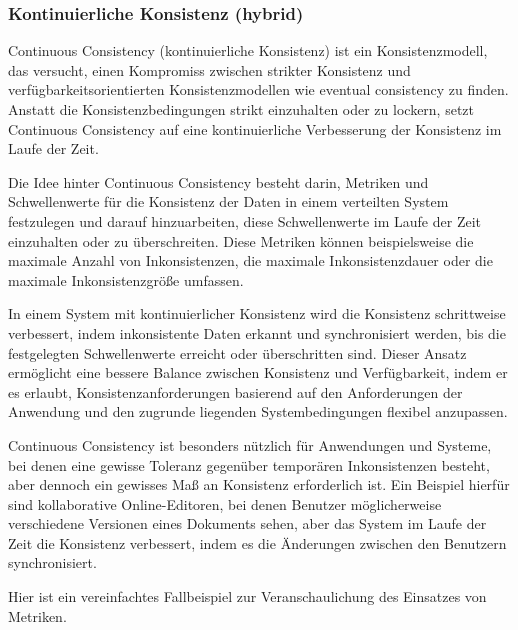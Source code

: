 \subsubsection{Kontinuierliche Konsistenz (hybrid)}
Continuous Consistency (kontinuierliche Konsistenz) ist ein Konsistenzmodell, das versucht, einen Kompromiss zwischen strikter Konsistenz und verfügbarkeitsorientierten Konsistenzmodellen wie eventual consistency zu finden. Anstatt die Konsistenzbedingungen strikt einzuhalten oder zu lockern, setzt Continuous Consistency auf eine kontinuierliche Verbesserung der Konsistenz im Laufe der Zeit.

Die Idee hinter Continuous Consistency besteht darin, Metriken und Schwellenwerte für die Konsistenz der Daten in einem verteilten System festzulegen und darauf hinzuarbeiten, diese Schwellenwerte im Laufe der Zeit einzuhalten oder zu überschreiten. Diese Metriken können beispielsweise die maximale Anzahl von Inkonsistenzen, die maximale Inkonsistenzdauer oder die maximale Inkonsistenzgröße umfassen.

In einem System mit kontinuierlicher Konsistenz wird die Konsistenz schrittweise verbessert, indem inkonsistente Daten erkannt und synchronisiert werden, bis die festgelegten Schwellenwerte erreicht oder überschritten sind. Dieser Ansatz ermöglicht eine bessere Balance zwischen Konsistenz und Verfügbarkeit, indem er es erlaubt, Konsistenzanforderungen basierend auf den Anforderungen der Anwendung und den zugrunde liegenden Systembedingungen flexibel anzupassen.

Continuous Consistency ist besonders nützlich für Anwendungen und Systeme, bei denen eine gewisse Toleranz gegenüber temporären Inkonsistenzen besteht, aber dennoch ein gewisses Maß an Konsistenz erforderlich ist. Ein Beispiel hierfür sind kollaborative Online-Editoren, bei denen Benutzer möglicherweise verschiedene Versionen eines Dokuments sehen, aber das System im Laufe der Zeit die Konsistenz verbessert, indem es die Änderungen zwischen den Benutzern synchronisiert.

Hier ist ein vereinfachtes Fallbeispiel zur Veranschaulichung des Einsatzes von Metriken.

